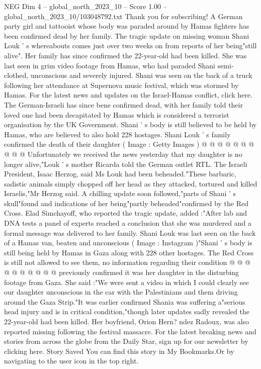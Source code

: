 \begin{textsample}{NEG Dim 4 – global\_north\_2023\_10 – Score 1.00 – global\_north\_2023\_10/103048792.txt}  \label{ex:f4_neg_016}
Thank you for subscribing!
A German party girl and tattooist whose body was paraded around by Hamas fighters has been confirmed dead by her family.
The tragic update on missing woman Shani Louk ' s whereabouts comes just over two weeks on from reports of her being"still alive".
Her family has since confirmed the 22-year-old had been killed.
She was last seen in grim video footage from Hamas, who had paraded Shani semi-clothed, unconscious and severely injured.
Shani was seen on the back of a truck following her attendance at Supernova music festival, which was stormed by Hamas.
For the latest news and updates on the Israel-Hamas conflict, click here.
The German-Israeli has since bene confirmed dead, with her family told their loved one had been decapitated by Hamas which is considered a terrorist organisation by the UK Government.
Shani ' s body is still believed to be held by Hamas, who are believed to also hold 228 hostages.
Shani Louk ' s family confirmed the death of their daughter ( Image : Getty Images ) @ @ @ @ @ @ @ @ @ @ Unfortunately we received the news yesterday that my daughter is no longer alive,"Louk ' s mother Ricarda told the German outlet RTL.
The Israeli President, Isaac Herzog, said Ms Louk had been beheaded."These barbaric, sadistic animals simply chopped off her head as they attacked, tortured and killed Israelis,"Mr Herzog said.
A chilling update soon followed,"parts of Shani ' s skull"found and indications of her being"partly beheaded"confirmed by the Red Cross.
Elad Simchayoff, who reported the tragic update, added :"After lab and DNA tests a panel of experts reached a conclusion that she was murdered and a formal message was delivered to her family.
Shani Louk was last seen on the back of a Hamas van, beaten and unconscious ( Image : Instagram )"Shani ' s body is still being held by Hamas in Gaza along with 228 other hostages.
The Red Cross is still not allowed to see them, no information regarding their condition @ @ @ @ @ @ @ @ @ @ previously confirmed it was her daughter in the disturbing footage from Gaza.
She said :"We were sent a video in which I could clearly see our daughter unconscious in the car with the Palestinians and them driving around the Gaza Strip."It was earlier confirmed Shania was suffering a"serious head injury and is in critical condition,"though later updates sadly revealed the 22-year-old had been killed.
Her boyfriend, Orion Hern? ndez Radoux, was also reported missing following the festival massacre.
For the latest breaking news and stories from across the globe from the Daily Star, sign up for our newsletter by clicking here.
Story Saved You can find this story in My Bookmarks.Or by navigating to the user icon in the top right.

\end{textsample}
